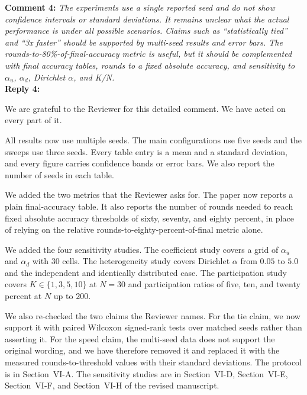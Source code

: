 \documentclass[10pt]{article}
\begin{document}
\noindent
\textbf{Comment 4:} \textit{The experiments use a single reported seed and do not show confidence intervals or standard deviations. It remains unclear what the actual performance is under all possible scenarios. Claims such as ``statistically tied'' and ``3x faster'' should be supported by multi-seed results and error bars. The rounds-to-80\%-of-final-accuracy metric is useful, but it should be complemented with final accuracy tables, rounds to a fixed absolute accuracy, and sensitivity to $\alpha_u$, $\alpha_d$, Dirichlet $\alpha$, and K/N.} \\
\noindent
\textbf{Reply 4:} {We are grateful to the Reviewer for this detailed comment. We have acted on every part of it.

All results now use multiple seeds. The main configurations use five seeds and the sweeps use three seeds. Every table entry is a mean and a standard deviation, and every figure carries confidence bands or error bars. We also report the number of seeds in each table.

We added the two metrics that the Reviewer asks for. The paper now reports a plain final-accuracy table. It also reports the number of rounds needed to reach fixed absolute accuracy thresholds of sixty, seventy, and eighty percent, in place of relying on the relative rounds-to-eighty-percent-of-final metric alone.

We added the four sensitivity studies. The coefficient study covers a grid of $\alpha_u$ and $\alpha_d$ with $30$ cells. The heterogeneity study covers Dirichlet $\alpha$ from $0.05$ to $5.0$ and the independent and identically distributed case. The participation study covers $K \in \{1, 3, 5, 10\}$ at $N = 30$ and participation ratios of five, ten, and twenty percent at $N$ up to $200$.

We also re-checked the two claims the Reviewer names. For the tie claim, we now support it with paired Wilcoxon signed-rank tests over matched seeds rather than asserting it. For the speed claim, the multi-seed data does not support the original wording, and we have therefore removed it and replaced it with the measured rounds-to-threshold values with their standard deviations. The protocol is in Section~VI-A. The sensitivity studies are in Section~VI-D, Section~VI-E, Section~VI-F, and Section~VI-H of the revised manuscript.}\\
\end{document}
